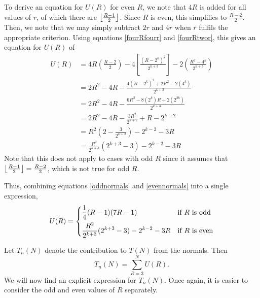 \documentclass[12pt]{article}
\DeclarePairedDelimiter\floor{\lfloor}{\rfloor}
\begin{document}
To derive an equation for $U(R)$ for even $R$, we note that $4R$ is added for all values of $r$, of which there are $\floor*{\frac{R-1}{2}}$. Since $R$ is even, this simplifies to $\frac{R-2}{2}$. Then, we note that we may simply subtract $2r$ and $4r$ when $r$ fulfils the appropriate criterion. Using equations \ref{fourRfourr} and \ref{fourRtwor}, this gives an equation for $U(R)$ of
\begin{align}
  U(R) &= 4R\left(\frac{R-2}{2}\right) - 4\left[ \frac{(R - 2^k)^2}{2^{k+3}} \right] - 2\left( \frac{R^2 - 4^k}{2^{k+3}} \right) \nonumber \\
  &= 2R^2 - 4R - \frac{4(R - 2^k)^2 + 2R^2 - 2(4^k)}{2^{k+3}} \nonumber \\
  &= 2R^2 - 4R - \frac{6R^2 - 8(2^k)R + 2(2^{2k})}{2^{k+3}} \nonumber \\
  &= 2R^2 - 4R - \frac{3R^2}{2^{k+2}} + R - 2^{k-2} \nonumber \\
  &= R^2\left( 2 - \frac{3}{2^{k+2}} \right) - 2^{k-2} - 3R \nonumber \\
  &= \frac{R^2}{2^{k+3}} (2^{k+3} - 3) - 2^{k-2} - 3R \label{evennormals}
\end{align}
Note that this does not apply to cases with odd $R$ since it assumes that $\floor*{\frac{R-1}{2}} = \frac{R-2}{2}$, which is not true for odd $R$.

Thus, combining equations \ref{oddnormals} and \ref{evennormals} into a single expression,
\begin{equation}
  U(R) =
  \begin{dcases}
    \frac{1}{4}(R - 1)(7R - 1) & \text{if } R \text{ is odd} \\
    \frac{R^2}{2^{k+3}}(2^{k+3} - 3) - 2^{k-2} - 3R & \text{if } R \text{ is even} \\
  \end{dcases}
  \label{UR}
\end{equation}

Let $T_n(N)$ denote the contribution to $T(N)$ from the normals. Then \[ T_n(N) = \sum_{R=3}^N U(R). \] We will now find an explicit expression for $T_n(N)$. Once again, it is easier to consider the odd and even values of $R$ separately.
\end{document}
